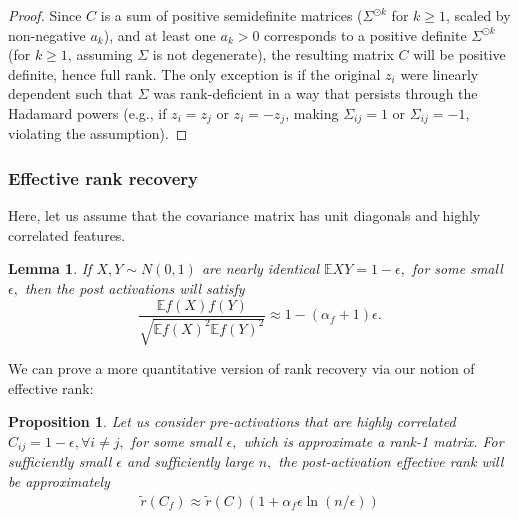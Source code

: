 \documentclass{article}
\newcommand{\E}{\mathbb{E}}
\newtheorem{lemma}{Lemma}[section]
\newtheorem{proposition}{Proposition}[section]
\numberwithin{figure}{section}
\begin{document}
\begin{proof}
    Since $C$ is a sum of positive semidefinite matrices ($\Sigma^{\odot k}$ for $k \ge 1$, scaled by non-negative $a_k$), and at least one $a_k > 0$ corresponds to a positive definite $\Sigma^{\odot k}$ (for $k \ge 1$, assuming $\Sigma$ is not degenerate), the resulting matrix $C$ will be positive definite, hence full rank. The only exception is if the original $z_i$ were linearly dependent such that $\Sigma$ was rank-deficient in a way that persists through the Hadamard powers (e.g., if $z_i = z_j$ or $z_i = -z_j$, making $\Sigma_{ij}=1$ or $\Sigma_{ij}=-1$, violating the assumption).
\end{proof}


\subsubsection*{Effective rank recovery}

Here, let us assume that the covariance matrix has unit diagonals and highly correlated features. 

\begin{lemma}
    If $X,Y \sim N(0,1)$ are nearly identical $\E X Y = 1- \epsilon,$ for some small $\epsilon, $ then the post activations will satisfy 
    \[
    \frac{\E f(X)f(Y)}{\sqrt{\E f(X)^2 \E f(Y)^2}}  \approx 1 - (\alpha_f + 1) \epsilon.
    \]
\end{lemma}

We can prove a more quantitative version of rank recovery via our notion of effective rank: 

\begin{proposition}
Let us consider pre-activations that are highly correlated $C_{ij} = 1-\epsilon,\forall i\neq j,$ for some small $\epsilon, $  which is approximate a rank-1 matrix. For sufficiently small $\epsilon$ and sufficiently large $n,$ the post-activation effective rank will be approximately 
    \begin{align*}
    \tilde{r}(C_f)\approx \tilde{r}(C)(1 + \alpha_f \epsilon \ln(n/\epsilon) )
\end{align*}
\end{proposition}
\end{document}
